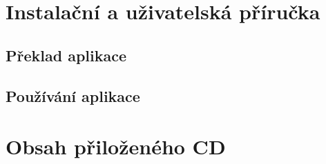 \documentclass[11pt,twoside,a4paper]{book}
\begin{document}
\chapter{Instalační a uživatelská příručka}
\label{chap:install}

\section{Překlad aplikace}
\section{Používání aplikace}

\chapter{Obsah přiloženého CD}
\end{document}
